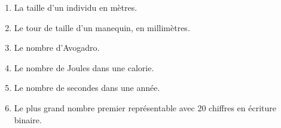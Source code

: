 
\begin{enumerate}[label=\emph{\alph*)}]
  \item La taille d'un individu en mètres. 
  \item Le tour de taille d'un manequin, en millimètres.
  \item Le nombre d'Avogadro.
  \item Le nombre de Joules dans une calorie.
  \item Le nombre de secondes dans une année.
  \item Le plus grand nombre premier représentable avec 20 chiffres en écriture binaire.
\end{enumerate}